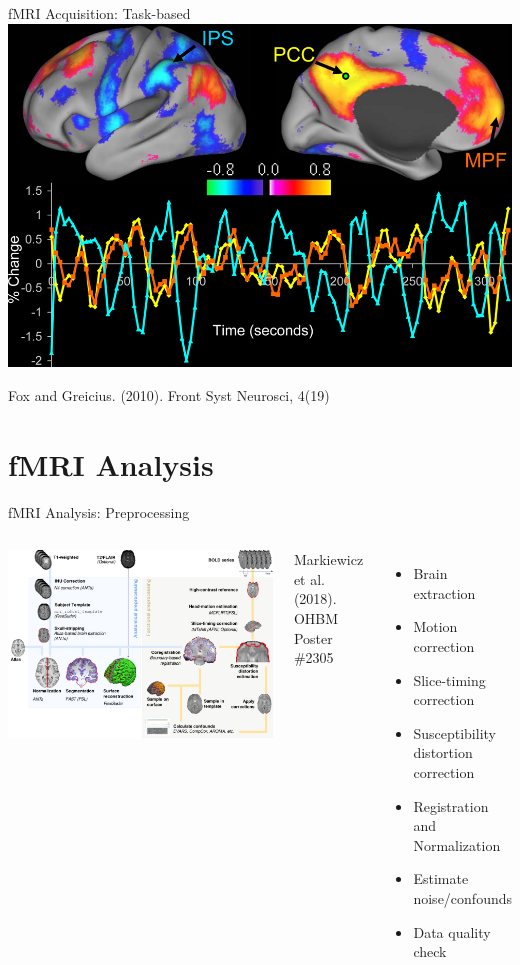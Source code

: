 \documentclass[aspectratio=169,xcolor=dvipsnames]{beamer}
\begin{document}

\begin{frame}{fMRI Acquisition: Task-based}
\includegraphics[width=.7\textwidth]{imgs/restingfmri}

\tiny{Fox and Greicius. (2010). Front Syst Neurosci, 4(19)}
\end{frame}

\section{fMRI Analysis}

\begin{frame}{fMRI Analysis: Preprocessing}
\begin{columns}[c]
\includegraphics[width=1\textwidth]{imgs/preprocess}

\tiny{Markiewicz et al. (2018). OHBM Poster \#2305}

\begin{itemize}
\item Brain extraction
\item Motion correction
\item Slice-timing correction
\item Susceptibility distortion correction
\item Registration and Normalization
\item Estimate noise/confounds
\item Data quality check
\end{itemize}
\end{columns}
\end{frame}
\end{document}
